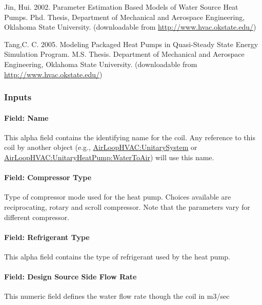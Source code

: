 Jin, Hui. 2002. Parameter Estimation Based Models of Water Source Heat Pumps. Phd. Thesis, Department of Mechanical and Aerospace Engineering, Oklahoma State University. (downloadable from \href{http://www.hvac.okstate.edu}{http://www.hvac.okstate.edu/})

Tang,C. C. 2005. Modeling Packaged Heat Pumps in Quasi-Steady State Energy Simulation Program. M.S. Thesis. Department of Mechanical and Aerospace Engineering, Oklahoma State University. (downloadable from \href{http://www.hvac.okstate.edu}{http://www.hvac.okstate.edu/})

\subsubsection{Inputs}\label{inputs-29}

\paragraph{Field: Name}\label{field-name-28}

This alpha field contains the identifying name for the coil. Any reference to this coil by another object (e.g., \hyperref[airloophvacunitarysystem]{AirLoopHVAC:UnitarySystem} or \hyperref[airloophvacunitaryheatpumpwatertoair]{AirLoopHVAC:UnitaryHeatPump:WaterToAir}) will use this name.

\paragraph{Field: Compressor Type}\label{field-compressor-type}

Type of compressor mode used for the heat pump. Choices available are reciprocating, rotary and scroll compressor. Note that the parameters vary for different compressor.

\paragraph{Field: Refrigerant Type}\label{field-refrigerant-type}

This alpha field contains the type of refrigerant used by the heat pump.

\paragraph{Field: Design Source Side Flow Rate}\label{field-design-source-side-flow-rate}

This numeric field defines the water flow rate though the coil in m3/sec

